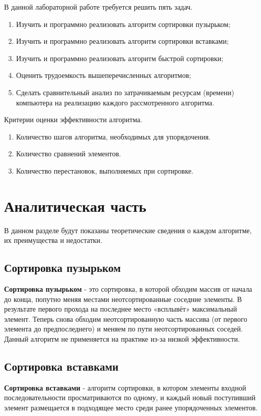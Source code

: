 \documentclass[12pt]{report}
\begin{document}
В данной лабораторной работе требуется решить пять задач.
\begin{enumerate}
\item Изучить и программно реализовать алгоритм сортировки пузырьком;
\item Изучить и программно реализовать алгоритм сортировки вставками;
\item Изучить и программно реализовать алгоритм быстрой сортировки;
\item Оценить трудоемкость вышеперечисленных алгоритмов;
\item Сделать сравнительный анализ по затрачиваемым ресурсам (времени) компьютера на реализацию каждого рассмотренного алгоритма.
\end{enumerate}
Критерии оценки эффективности алгоритма.
\begin{enumerate}
\item Количество шагов алгоритма, необходимых для упорядочения.
\item Количество сравнений элементов.
\item Количество перестановок, выполняемых при сортировке.
\end{enumerate}
\chapter{Аналитическая часть}
 В данном разделе будут показаны теоретические сведения о каждом алгоритме, их преимущества и недостатки.

 \section{Сортировка пузырьком}

 \textbf{Сортировка пузырьком} - это сортировка, в которой обходим массив от начала до конца, попутно меняя местами неотсортированные соседние элементы. В результате первого прохода на последнее место «всплывёт» максимальный элемент. Теперь снова обходим неотсортированную часть массива (от первого элемента до предпоследнего) и меняем по пути неотсортированных соседей. Данный алгоритм не применяется на практике из-за низкой эффективности. ~\cite{two}
 
 \section{Сортировка вставками}
 \textbf{Сортировка вставками} - алгоритм сортировки, в котором элементы входной последовательности просматриваются по одному, и каждый новый поступивший элемент размещается в подходящее место среди ранее упорядоченных элементов. ~\cite{free} 
 
\end{document}
